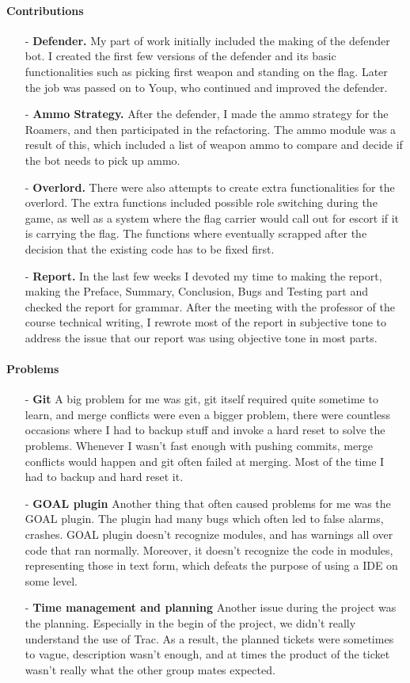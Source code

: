 \paragraph{Contributions}
\begin{itemize}
\item[-] \textbf{Defender.}
My part of work initially included the making of the defender bot. I created the first few versions of the defender and its basic functionalities such as picking first weapon and standing on the flag. Later the job was passed on to Youp, who continued and improved the defender.
\item[-] \textbf{Ammo Strategy.}
After the defender, I made the ammo strategy for the Roamers, and then participated in the refactoring. The ammo module was a result of this, which included a list of weapon ammo to compare and decide if the bot needs to pick up ammo.
\item[-] \textbf{Overlord.}
There were also attempts to create extra functionalities for the overlord. The extra functions included possible role switching during the game, as well as a system where the flag carrier would call out for escort if it is carrying the flag. The functions where eventually scrapped after the decision that the existing code has to be fixed first.
\item[-] \textbf{Report.}
In the last few weeks I devoted my time to making the report, making the Preface, Summary, Conclusion, Bugs and Testing part and checked the report for grammar. After the meeting with the professor of the course technical writing, I rewrote most of the report in subjective tone to address the issue that our report was using objective tone in most parts.
\end{itemize}
\noindent
\paragraph{Problems}
\begin{itemize}
\item[-] \textbf{Git}
A big problem for me was git, git itself required quite sometime to learn, and merge conflicts were even a bigger problem, there were countless occasions where I had to backup stuff and invoke a hard reset to solve the problems. Whenever I wasn't fast enough with pushing commits, merge conflicts would happen and git often failed at merging. Most of the time I had to backup and hard reset it.
\item[-] \textbf{GOAL plugin}
Another thing that often caused problems for me was the GOAL plugin. The plugin had many bugs which often led to false alarms, crashes. GOAL plugin doesn't recognize modules, and has warnings all over code that ran normally. Moreover, it doesn't recognize the code in modules, representing those in text form, which defeats the purpose of using a IDE on some level.
\item[-] \textbf{Time management and planning}
Another issue during the project was the planning. Especially in the begin of the project, we didn't really understand the use of Trac. As a result, the planned tickets were sometimes to vague, description wasn't enough, and at times the product of the ticket wasn't really what the other group mates expected.
\end{itemize}
